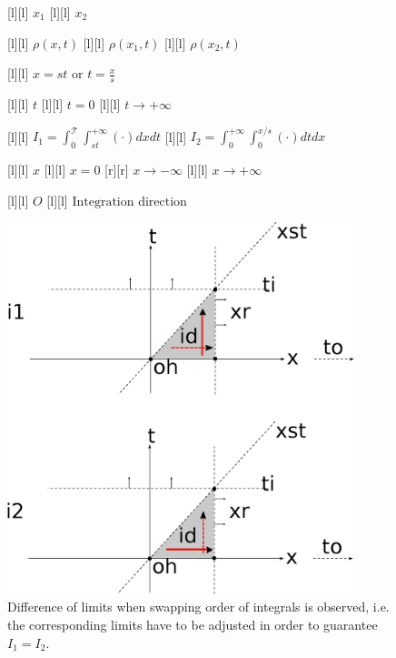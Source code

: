 \begin{figure}[ht]
	\centering
	\footnotesize


	[l] {$x_1$}
	[l] {$x_2$}

	[l] {$\rho(x,t)$}
	[l] {$\rho(x_{1},t)$}
	[l] {$\rho(x_{2},t)$}

	[l] {$\displaystyle x=st\text{ or }t=\frac{x}{s}$}

	[l] {$t$}
	[l] {$t = 0$}
	[l] {$t \rightarrow +\infty$}


	[l] {$\displaystyle I_{1} = \int_{0}^{\mathscr{T}}\int_{st}^{+\infty} \left(\cdot\right)dxdt$}
	[l] {$\displaystyle I_{2}
			=
			\int_{0}^{+\infty}\int_{0}^{x/s} \left(\cdot\right)dtdx
		$}

	[l] {$x$}
	[l] {$x=0$}
	[r] {$x\rightarrow -\infty$}
	[l] {$x\rightarrow +\infty$}

	[l] {$O$}
	[l] {$\text{Integration direction}$}

	\includegraphics[width=0.9\textwidth]{orderintegraluR.eps}
	\caption{Difference of limits when swapping order of integrals is observed, i.e. the corresponding limits
		have to be adjusted in order to guarantee $I_{1} = I_{2}$.}
	\label{\LABEL}
\end{figure}
